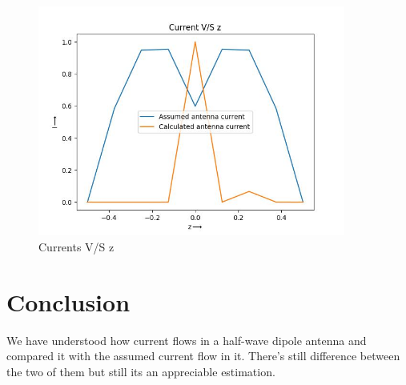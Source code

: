 \documentclass[15pt,a4paper]{article}
\begin{document}
\begin{figure}[!tbh]

\includegraphics[width = 0.9\textwidth]{latux.jpeg}
\caption{Currents V/S z}

\end{figure}

\section{Conclusion}

We have understood how current flows in a half-wave dipole antenna and compared it with the assumed current flow in it. There's still difference between the two of them but still its an appreciable estimation.
\end{document}

